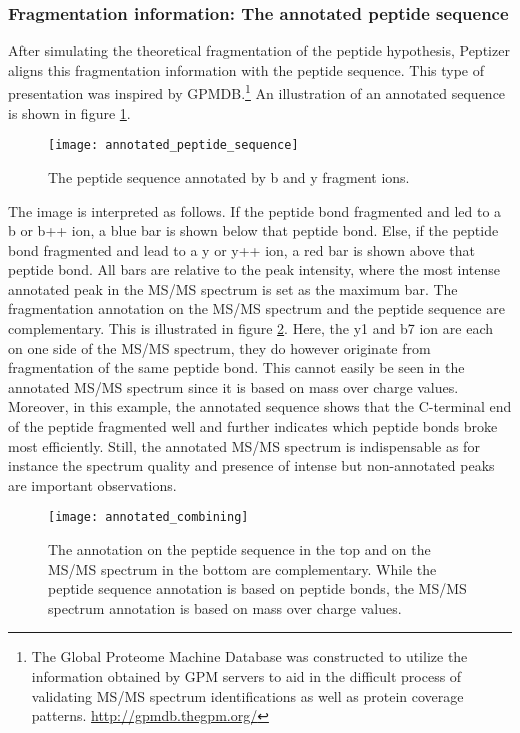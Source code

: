 \subsubsection{Fragmentation information: The annotated peptide sequence}
\npar After simulating the theoretical fragmentation of the peptide hypothesis, Peptizer aligns this fragmentation information with the peptide sequence. This type of presentation was inspired by GPMDB.\footnote{The Global Proteome Machine Database was constructed to utilize the information obtained by GPM servers to aid in the difficult process of validating MS/MS spectrum identifications as well as protein coverage patterns. \url{http://gpmdb.thegpm.org/}}
\npar An illustration of an annotated sequence is shown in figure \ref{annotated_peptide_sequence}.
%
\begin{figure}[h!]
\begin{center}
	\texttt{[image: annotated\_peptide\_sequence]}
	\caption{\label{annotated_peptide_sequence}The peptide sequence annotated by b and y fragment ions.}
\end{center}
\end{figure}
%
\npar The image is interpreted as follows. If the peptide bond fragmented and led to a b or b++ ion, a blue bar is shown below that peptide bond. Else, if the peptide bond fragmented and lead to a y or y++ ion, a red bar is shown above that peptide bond. All bars are relative to the peak intensity, where the most intense annotated peak in the MS/MS spectrum is set as the maximum bar.
%
\npar The fragmentation annotation on the MS/MS spectrum and the peptide sequence are complementary. This is illustrated in figure \ref{annotated_combining}. Here, the y1 and b7 ion are each on one side of the MS/MS spectrum, they do however originate from fragmentation of the same peptide bond. This cannot easily be seen in the annotated MS/MS spectrum since it is based on mass over charge values. Moreover, in this example, the annotated sequence shows that the C-terminal end of the peptide fragmented well and further indicates which peptide bonds broke most efficiently. Still, the annotated MS/MS spectrum is indispensable as for instance the spectrum quality and presence of intense but non-annotated peaks are important observations.
%
\begin{figure}[h!]
\begin{center}
	\texttt{[image: annotated\_combining]}
	\caption{\label{annotated_combining}The annotation on the peptide sequence in the top and on the MS/MS spectrum in the bottom are complementary. While the peptide sequence annotation is based on peptide bonds, the MS/MS spectrum annotation is based on mass over charge values.}
\end{center}
\end{figure}
%

